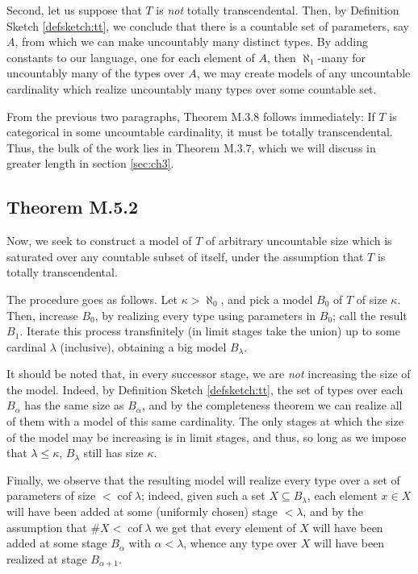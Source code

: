 \documentclass{article}
\theoremstyle{nonumberplain}
\DeclareMathOperator{\cof}{cof}
\newcommand{\card}[1]{\#{#1}}
\begin{document}
Second, let us suppose that $T$ is \emph{not} totally transcendental. Then, by Definition Sketch \ref{defsketch:tt}, we conclude that there is a countable set of parameters, say $A$, from which we can make uncountably many distinct types. By adding constants to our language, one for each element of $A$, then $\aleph_1$-many for uncountably many of the types over $A$, we may create models of any uncountable cardinality which realize uncountably many types over some countable set.

From the previous two paragraphs, Theorem M.3.8 follows immediately: If $T$ is categorical in some uncountable cardinality, it must be totally transcendental. Thus, the bulk of the work lies in Theorem M.3.7, which we will discuss in greater length in section \ref{sec:ch3}.

\subsection{Theorem M.5.2}

Now, we seek to construct a model of $T$ of arbitrary uncountable size which is saturated over any countable subset of itself, under the assumption that $T$ is totally transcendental.

The procedure goes as follows. Let $\kappa > \aleph_0$, and pick a model $B_0$ of $T$ of size $\kappa$. Then, increase $B_0$, by realizing every type using parameters in $B_0$; call the result $B_1$. Iterate this process transfinitely (in limit stages take the union) up to some cardinal $\lambda$ (inclusive), obtaining a big model $B_\lambda$.

It should be noted that, in every successor stage, we are \emph{not} increasing the size of the model. Indeed, by Definition Sketch \ref{defsketch:tt}, the set of types over each $B_\alpha$ has the same size as $B_\alpha$, and by the completeness theorem we can realize all of them with a model of this same cardinality. The only stages at which the size of the model may be increasing is in limit stages, and thus, so long as we impose that $\lambda \leq \kappa$, $B_\lambda$ still has size $\kappa$.

Finally, we observe that the resulting model will realize every type over a set of parameters of size $<\cof\lambda$; indeed, given such a set $X \subseteq B_\lambda$, each element $x \in X$ will have been added at some (uniformly chosen) stage $<\lambda$, and by the assumption that $\card X < \cof \lambda$ we get that every element of $X$ will have been added at some stage $B_\alpha$ with $\alpha < \lambda$, whence any type over $X$ will have been realized at stage $B_{\alpha+1}$.
\end{document}
